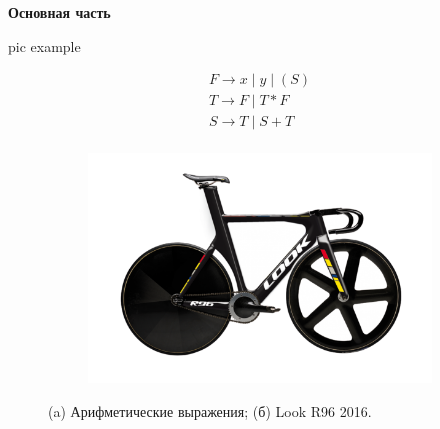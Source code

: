 \documentclass[oneside,a4paper,14pt,final]{extreport}
\begin{document}

\thispagestyle{empty} %

\tableofcontents


\newpage
\vspace*{11cm}
\centerline{\LARGE\sc\textbf{Основная часть}}
\thispagestyle{empty}



\normalem %
\printbibliography[heading=bibintoc,title={Список использованных источников}]


pic example
\begin{figure}[ht]
\centering
    \begin{subfigure}[b]{0.3\textwidth}
    \centering
        $$\begin{array}{l}
        F \to x \;|\; y \;|\; (S) \\
        T \to F \;|\; T \ast F \\
        S \to T \;|\; S + T \\
        \end{array}$$
        \caption{}
    \end{subfigure} %
    \begin{subfigure}[b]{0.6\textwidth}
    \centering
        \includegraphics[scale=0.5]{look-track.png}
        \caption{}
    \end{subfigure}

    \caption{(a) Арифметические выражения;
             (б) Look R96 2016.}
    \label{fig_parsetree}
\end{figure}
\end{document}
